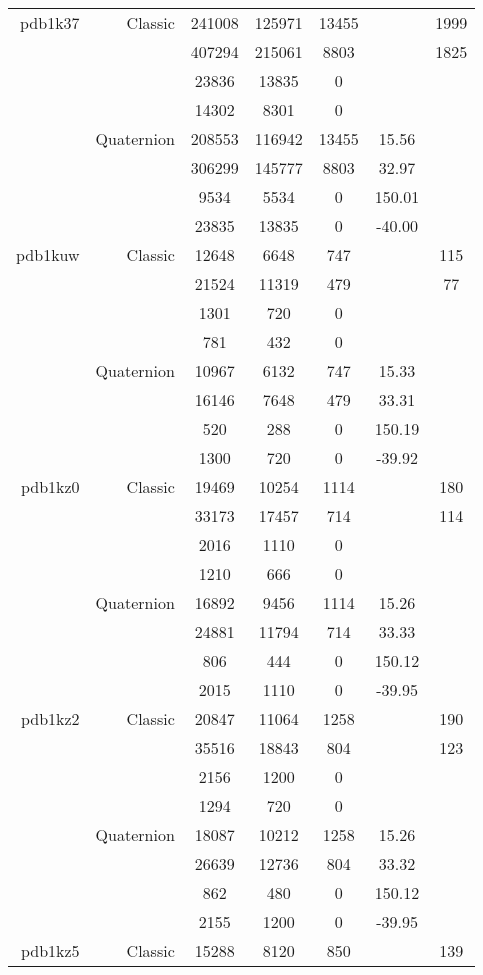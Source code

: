 \begin{xltabular}{\textwidth}{r|rcccSc}
pdb1k37 & Classic & 241008 & 125971 & 13455 & & 1999 \\
& & 407294 & 215061 & 8803 & & 1825 \\
& & 23836 & 13835 & 0 & & \\
& & 14302 & 8301 & 0 & & \\
& Quaternion & 208553 & 116942 & 13455 & 15.56 & \\
& & 306299 & 145777 & 8803 & 32.97 & \\
& & 9534 & 5534 & 0 & 150.01 & \\
& & 23835 & 13835 & 0 & -40.00 & \\ \addlinespace
pdb1kuw & Classic & 12648 & 6648 & 747 & & 115 \\
& & 21524 & 11319 & 479 & & 77 \\
& & 1301 & 720 & 0 & & \\
& & 781 & 432 & 0 & & \\
& Quaternion & 10967 & 6132 & 747 & 15.33 & \\
& & 16146 & 7648 & 479 & 33.31 & \\
& & 520 & 288 & 0 & 150.19 & \\
& & 1300 & 720 & 0 & -39.92 & \\ \addlinespace
pdb1kz0 & Classic & 19469 & 10254 & 1114 & & 180 \\
& & 33173 & 17457 & 714 & & 114 \\
& & 2016 & 1110 & 0 & & \\
& & 1210 & 666 & 0 & & \\
& Quaternion & 16892 & 9456 & 1114 & 15.26 & \\
& & 24881 & 11794 & 714 & 33.33 & \\
& & 806 & 444 & 0 & 150.12 & \\
& & 2015 & 1110 & 0 & -39.95 & \\ \addlinespace
pdb1kz2 & Classic & 20847 & 11064 & 1258 & & 190 \\
& & 35516 & 18843 & 804 & & 123 \\
& & 2156 & 1200 & 0 & & \\
& & 1294 & 720 & 0 & & \\
& Quaternion & 18087 & 10212 & 1258 & 15.26 & \\
& & 26639 & 12736 & 804 & 33.32 & \\
& & 862 & 480 & 0 & 150.12 & \\
& & 2155 & 1200 & 0 & -39.95 & \\ \addlinespace
pdb1kz5 & Classic & 15288 & 8120 & 850 & & 139 \\

\end{xltabular}
